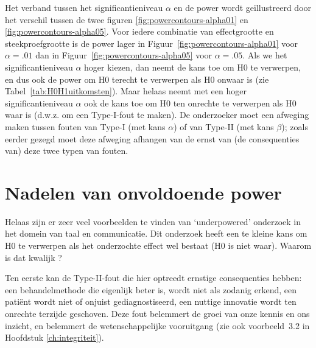 \documentclass[
]{book}
\begin{document}
Het verband tussen het significantieniveau \(\alpha\) en de power wordt
geïllustreerd door het verschil tussen de twee figuren
\ref{fig:powercontours-alpha01} en
\ref{fig:powercontours-alpha05}. Voor iedere combinatie van
effectgrootte en steekproefgrootte is de power lager in
Figuur~\ref{fig:powercontours-alpha01} voor \(\alpha=.01\) dan in
Figuur~\ref{fig:powercontours-alpha05} voor \(\alpha=.05\). Als we het
significantieniveau \(\alpha\) hoger kiezen, dan neemt de kans toe om H0
te verwerpen, en dus ook de power om H0 terecht te verwerpen als H0
onwaar is (zie
Tabel~\ref{tab:H0H1uitkomsten}). Maar helaas neemt met een hoger
significantieniveau \(\alpha\) ook de kans toe om H0 ten onrechte te
verwerpen als H0 waar is (d.w.z. om een Type-I-fout te maken). De
onderzoeker moet een afweging maken tussen fouten van Type-I (met
kans \(\alpha\)) of van Type-II (met kans \(\beta\)); zoals eerder gezegd
moet deze afweging afhangen van de ernst van (de consequenties van) deze
twee typen van fouten.

\hypertarget{nadelen-van-onvoldoende-power}{%
\section{Nadelen van onvoldoende power}\label{nadelen-van-onvoldoende-power}}

Helaas zijn er zeer veel voorbeelden te vinden van `underpowered'
onderzoek in het domein van taal en communicatie. Dit onderzoek heeft
een te kleine kans om H0 te verwerpen als het onderzochte effect wel
bestaat (H0 is niet waar). Waarom is dat kwalijk \citep{Quene10}?

Ten eerste kan de Type-II-fout die hier optreedt ernstige consequenties
hebben: een behandelmethode die eigenlijk beter is, wordt niet als
zodanig erkend, een patiënt wordt niet of onjuist gediagnostiseerd, een
nuttige innovatie wordt ten onrechte terzijde geschoven. Deze fout
belemmert de groei van onze kennis en ons inzicht, en belemmert de
wetenschappelijke vooruitgang (zie ook
voorbeeld~3.2 in Hoofdstuk \ref{ch:integriteit}).
\end{document}
